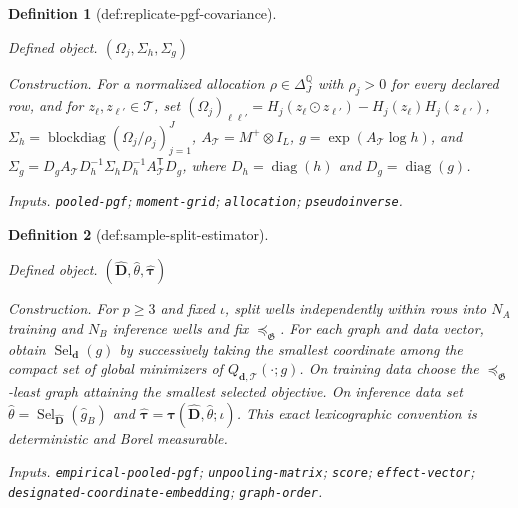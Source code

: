 \documentclass{article}
\newtheorem{definition}{Definition}
\begin{document}
\begin{definition}[def:replicate-pgf-covariance]\label{def:replicate-pgf-covariance}
\par\smallskip\noindent\emph{Defined object.} \((\Omega_j,\Sigma_h,\Sigma_g)\)
\par\smallskip\noindent\emph{Construction.} For a normalized allocation \(\rho\in\Delta_J^{\mathbb Q}\) with \(\rho_j>0\) for every declared row, and for \(z_\ell,z_{\ell'}\in\mathcal T\), set \((\Omega_j)_{\ell\ell'}=H_j(z_\ell\odot z_{\ell'})-H_j(z_\ell)H_j(z_{\ell'})\), \(\Sigma_h=\operatorname{blockdiag}(\Omega_j/\rho_j)_{j=1}^{J}\), \(A_{\mathcal T}=M^{+}\otimes I_L\), \(g=\exp(A_{\mathcal T}\log h)\), and \(\Sigma_g=D_gA_{\mathcal T}D_h^{-1}\Sigma_hD_h^{-1}A_{\mathcal T}^{\mathsf T}D_g\), where \(D_h=\operatorname{diag}(h)\) and \(D_g=\operatorname{diag}(g)\).
\par\smallskip\noindent\emph{Inputs.} \texttt{pooled-\allowbreak{}pgf}; \texttt{moment-\allowbreak{}grid}; \texttt{allocation}; \texttt{pseudoinverse}.
\end{definition}

\begin{definition}[def:sample-split-estimator]\label{def:sample-split-estimator}
\par\smallskip\noindent\emph{Defined object.} \((\widehat{\boldsymbol D},\widehat\theta,\widehat{\boldsymbol\tau})\)
\par\smallskip\noindent\emph{Construction.} For \(p\geq3\) and fixed \(\iota\), split wells independently within rows into \(N_A\) training and \(N_B\) inference wells and fix \(\preceq_{\mathfrak G}\). For each graph and data vector, obtain \(\operatorname{Sel}_{\boldsymbol d}(g)\) by successively taking the smallest coordinate among the compact set of global minimizers of \(Q_{\boldsymbol d,\mathcal T}(\cdot;g)\). On training data choose the \(\preceq_{\mathfrak G}\)-least graph attaining the smallest selected objective. On inference data set \(\widehat\theta=\operatorname{Sel}_{\widehat{\boldsymbol D}}(\widehat g_B)\) and \(\widehat{\boldsymbol\tau}=\boldsymbol\tau(\widehat{\boldsymbol D},\widehat\theta;\iota)\). This exact lexicographic convention is deterministic and Borel measurable.
\par\smallskip\noindent\emph{Inputs.} \texttt{empirical-\allowbreak{}pooled-\allowbreak{}pgf}; \texttt{unpooling-\allowbreak{}matrix}; \texttt{score}; \texttt{effect-\allowbreak{}vector}; \texttt{designated-\allowbreak{}coordinate-\allowbreak{}embedding}; \texttt{graph-\allowbreak{}order}.
\end{definition}
\end{document}
